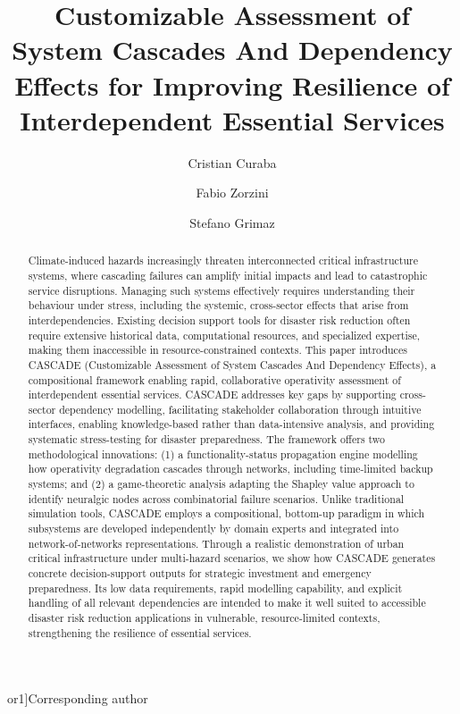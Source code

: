\documentclass[review,12pt]{elsarticle}
\def\corref#1{}%
\def\cortext#1#2{}%
\begin{document}
\linenumbers
\begin{frontmatter}

\title{Customizable Assessment of System Cascades And Dependency Effects for Improving Resilience of Interdependent Essential Services}

\author[uniud]{Cristian Curaba\corref{cor1}}
\cortext[cor1]{Corresponding author}
\author[uniud]{Fabio Zorzini}
\author[uniud]{Stefano Grimaz}



\begin{abstract}
Climate-induced hazards increasingly threaten interconnected critical infrastructure systems, where cascading failures can amplify initial impacts and lead to catastrophic service disruptions. Managing such systems effectively requires understanding their behaviour under stress, including the systemic, cross-sector effects that arise from interdependencies. Existing decision support tools for disaster risk reduction often require extensive historical data, computational resources, and specialized expertise, making them inaccessible in resource-constrained contexts.
This paper introduces CASCADE (Customizable Assessment of System Cascades And Dependency Effects), a compositional framework enabling rapid, collaborative operativity assessment of interdependent essential services. CASCADE addresses key gaps by supporting cross-sector dependency modelling, facilitating stakeholder collaboration through intuitive interfaces, enabling knowledge-based rather than data-intensive analysis, and providing systematic stress-testing for disaster preparedness.
The framework offers two methodological innovations: (1) a functionality-status propagation engine modelling how operativity degradation cascades through networks, including time-limited backup systems; and (2) a game-theoretic analysis adapting the Shapley value approach to identify neuralgic nodes across combinatorial failure scenarios. Unlike traditional simulation tools, CASCADE employs a compositional, bottom-up paradigm in which subsystems are developed independently by domain experts and integrated into network-of-networks representations.
Through a realistic demonstration of urban critical infrastructure under multi-hazard scenarios, we show how CASCADE generates concrete decision-support outputs for strategic investment and emergency preparedness. Its low data requirements, rapid modelling capability, and explicit handling of all relevant dependencies are intended to make it well suited to accessible disaster risk reduction applications in vulnerable, resource-limited contexts, strengthening the resilience of essential services.
\end{abstract}


\end{frontmatter}
\end{document}
